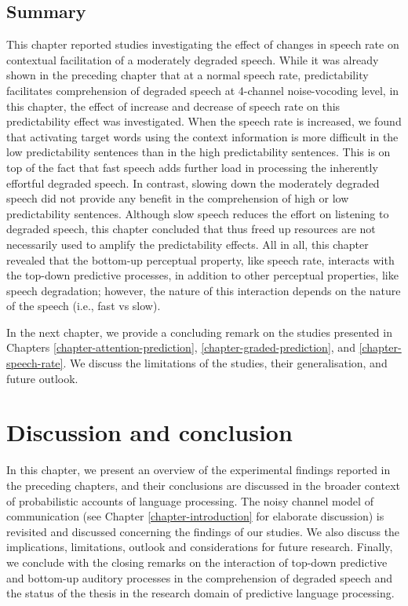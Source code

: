 \documentclass[a4paper, nobind]{templates/ociamthesis}
\begin{document}
\hypertarget{summary-4}{%
\section{Summary}\label{summary-4}}

This chapter reported studies investigating the effect of changes in speech rate on contextual facilitation of a moderately degraded speech.
While it was already shown in the preceding chapter that at a normal speech rate, predictability facilitates comprehension of degraded speech at 4-channel noise-vocoding level,
in this chapter, the effect of increase and decrease of speech rate on this predictability effect was investigated.
When the speech rate is increased, we found that activating target words using the context information is more difficult in the low predictability sentences than in the high predictability sentences.
This is on top of the fact that fast speech adds further load in processing the inherently effortful degraded speech.
In contrast, slowing down the moderately degraded speech did not provide any benefit in the comprehension of high or low predictability sentences.
Although slow speech reduces the effort on listening to degraded speech,
this chapter concluded that thus freed up resources are not necessarily used to amplify the predictability effects.
All in all, this chapter revealed that the bottom-up perceptual property, like speech rate, interacts with the top-down predictive processes, in addition to other perceptual properties, like speech degradation;
however, the nature of this interaction depends on the nature of the speech (i.e., fast vs slow).

In the next chapter, we provide a concluding remark on the studies presented in Chapters \ref{chapter-attention-prediction}, \ref{chapter-graded-prediction}, and \ref{chapter-speech-rate}.
We discuss the limitations of the studies, their generalisation, and future outlook.

\hypertarget{chapter-conclusion}{%
\chapter{Discussion and conclusion}\label{chapter-conclusion}}

In this chapter, we present an overview of the experimental findings reported in the preceding chapters, and
their conclusions are discussed in the broader context of probabilistic accounts of language processing.
The noisy channel model of communication (see Chapter \ref{chapter-introduction} for elaborate discussion) is revisited and discussed concerning the findings of our studies.
We also discuss the implications, limitations, outlook and considerations for future research.
Finally, we conclude with the closing remarks on the interaction of top-down predictive and bottom-up auditory processes in the comprehension of degraded speech
and the status of the thesis in the research domain of predictive language processing.
\end{document}

